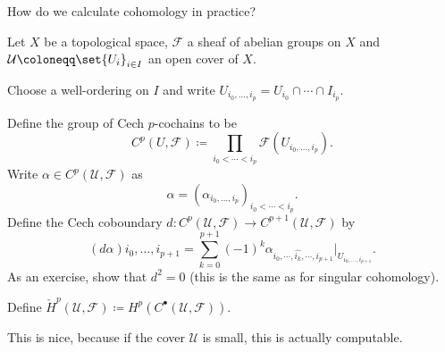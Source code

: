 How do we calculate cohomology in practice?

Let $X$ be a topological space, $\mathcal{F}$ a sheaf of abelian groups
on $X$ and $\mathcal{U} \coloneqq \set{U_i}_{i \in I}$ an open cover of $X$.

Choose a well-ordering on $I$ and write $U_{i_0, \ldots, i_p} = U_{i_0}\cap\cdots\cap I_{i_p}$.

Define the group of Cech $p$-cochains to be
\[ C^p(U, \mathcal{F}) \coloneqq \prod_{i_0 < \cdots < i_p} \mathcal{F}(U_{i_0, \ldots, i_p}). \]
Write $\alpha \in C^p(\mathcal{U}, \mathcal{F})$ as
\[ \alpha = (\alpha_{i_0, \ldots, i_p})_{i_0<\cdots<i_p}. \]
Define the Cech coboundary $d\colon C^p(\mathcal{U}, \mathcal{F}) \to C^{p+1}(\mathcal{U}, \mathcal{F})$
by
\[ (d\alpha){i_0, \ldots, i_{p+1}} = \sum_{k=0}^{p+1} (-1)^k\alpha_{i_0, \cdots, \hat{i_k}, \cdots, i_{p+1}}|_{U_{i_0, \ldots, i_{p+1}}}. \]
As an exercise, show that $d^2 = 0$ (this is the same as for singular cohomology).

Define $\check{H}^p(\mathcal{U}, \mathcal{F}) \coloneqq H^p(C^\bullet(\mathcal{U}, \mathcal{F}))$.

This is nice, because if the cover $\mathcal{U}$ is small, this is actually computable.
